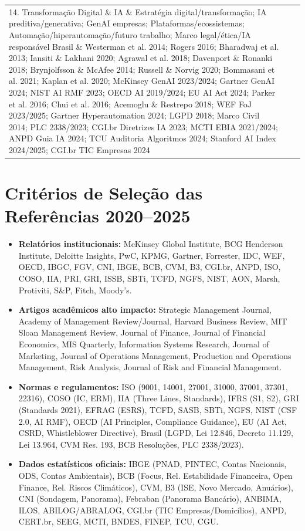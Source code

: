 \begin{longtable}{p{2.5cm}p{5.5cm}p{5.5cm}}
14. Transformação Digital \& IA \&
Estratégia digital/transformação; IA preditiva/generativa; GenAI empresas; Plataformas/ecossistemas; Automação/hiperautomação/futuro trabalho; Marco legal/ética/IA responsável Brasil \&
Westerman et al. 2014; Rogers 2016; Bharadwaj et al. 2013; Iansiti \& Lakhani 2020; Agrawal et al. 2018; Davenport \& Ronanki 2018; Brynjolfsson \& McAfee 2014; Russell \& Norvig 2020; Bommasani et al. 2021; Kaplan et al. 2020; McKinsey GenAI 2023/2024; Gartner GenAI 2024; NIST AI RMF 2023; OECD AI 2019/2024; EU AI Act 2024; Parker et al. 2016; Chui et al. 2016; Acemoglu \& Restrepo 2018; WEF FoJ 2023/2025; Gartner Hyperautomation 2024; LGPD 2018; Marco Civil 2014; PLC 2338/2023; CGI.br Diretrizes IA 2023; MCTI EBIA 2021/2024; ANPD Guia IA 2024; TCU Auditoria Algoritmos 2024; Stanford AI Index 2024/2025; CGI.br TIC Empresas 2024 \\

\end{longtable}

\section*{Critérios de Seleção das Referências 2020–2025}
\begin{itemize}
    \item \textbf{Relatórios institucionais:} McKinsey Global Institute, BCG Henderson Institute, Deloitte Insights, PwC, KPMG, Gartner, Forrester, IDC, WEF, OECD, IBGC, FGV, CNI, IBGE, BCB, CVM, B3, CGI.br, ANPD, ISO, COSO, IIA, PRI, GRI, ISSB, SBTi, TCFD, NGFS, NIST, AON, Marsh, Protiviti, S\&P, Fitch, Moody's.
    \item \textbf{Artigos acadêmicos alto impacto:} Strategic Management Journal, Academy of Management Review/Journal, Harvard Business Review, MIT Sloan Management Review, Journal of Finance, Journal of Financial Economics, MIS Quarterly, Information Systems Research, Journal of Marketing, Journal of Operations Management, Production and Operations Management, Risk Analysis, Journal of Risk and Financial Management.
    \item \textbf{Normas e regulamentos:} ISO (9001, 14001, 27001, 31000, 37001, 37301, 22316), COSO (IC, ERM), IIA (Three Lines, Standards), IFRS (S1, S2), GRI (Standards 2021), EFRAG (ESRS), TCFD, SASB, SBTi, NGFS, NIST (CSF 2.0, AI RMF), OECD (AI Principles, Compliance Guidance), EU (AI Act, CSRD, Whistleblower Directive), Brasil (LGPD, Lei 12.846, Decreto 11.129, Lei 13.964, CVM Res. 193, BCB Resoluções, PLC 2338/2023).
    \item \textbf{Dados estatísticos oficiais:} IBGE (PNAD, PINTEC, Contas Nacionais, ODS, Contas Ambientais), BCB (Focus, Rel. Estabilidade Financeira, Open Finance, Rel. Riscos Climáticos), CVM, B3 (ISE, Novo Mercado, Anuários), CNI (Sondagem, Panorama), Febraban (Panorama Bancário), ANBIMA, ILOS, ABILOG/ABRALOG, CGI.br (TIC Empresas/Domicílios), ANPD, CERT.br, SEEG, MCTI, BNDES, FINEP, TCU, CGU.
\end{itemize}

